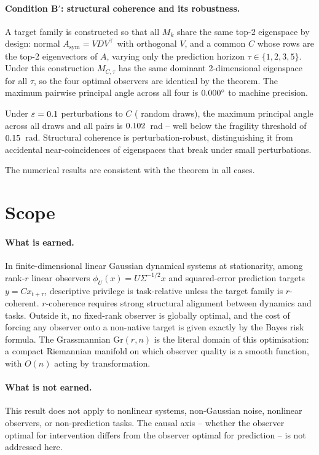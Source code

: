 \documentclass[11pt]{article}
\newcommand{\Gr}{\mathrm{Gr}}
\begin{document}
\paragraph{Condition B$'$: structural coherence and its robustness.}
A target family is constructed so that all $M_k$ share the same top-2
eigenspace by design: normal $A_{\mathrm{sym}} = VDV^\top$ with orthogonal
$V$, and a common $C$ whose rows are the top-2 eigenvectors of $A$, varying
only the prediction horizon $\tau \in \{1,2,3,5\}$.
Under this construction $M_{C,\tau}$ has the same dominant 2-dimensional
eigenspace for all $\tau$, so the four optimal observers are identical by the
theorem.
The maximum pairwise principal angle across all four is
$0.000^\circ$ to machine precision.

Under $\varepsilon = 0.1$ perturbations to $C$
(\CondBPertDraws{} random draws), the maximum principal angle across all
draws and all pairs is $0.102$~rad -- well below the fragility
threshold of $0.15$~rad.
Structural coherence is perturbation-robust, distinguishing it from
accidental near-coincidences of eigenspaces that break under small
perturbations.

The numerical results are consistent with the theorem in all cases.

\section{Scope}

\paragraph{What is earned.}
In finite-dimensional linear Gaussian dynamical systems at stationarity,
among rank-$r$ linear observers $\phi_U(x)=U\Sigma^{-1/2}x$ and
squared-error prediction targets $y=Cx_{t+\tau}$,
descriptive privilege is task-relative unless the target family is
$r$-coherent.
$r$-coherence requires strong structural alignment between dynamics and tasks.
Outside it, no fixed-rank observer is globally optimal, and the cost of
forcing any observer onto a non-native target is given exactly by the Bayes
risk formula.
The Grassmannian $\Gr(r,n)$ is the literal domain of this optimisation:
a compact Riemannian manifold on which observer quality is a smooth function,
with $O(n)$ acting by transformation.

\paragraph{What is not earned.}
This result does not apply to nonlinear systems, non-Gaussian noise,
nonlinear observers, or non-prediction tasks.
The causal axis -- whether the observer optimal for intervention differs from
the observer optimal for prediction -- is not addressed here.
\end{document}
